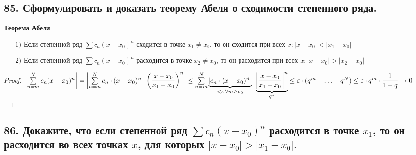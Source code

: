 \documentclass[a4paper, fleqn]{article}
\begin{document}
    \subsection*{85. Сформулировать и доказать теорему Абеля о сходимости степенного ряда.}
	\textbf{ Теорема Абеля} \\[-15 pt] 
	\begin{enumerate}
	\item[$1)$] Если степенной ряд $\sum c_n (x - x_0)^n$ сходится в точке $x_1 \ne x_0$, 
	то он сходится при всех $x : |x - x_0| < |x_1 - x_0|$
	\item[$2)$] Если степенной ряд $\sum c_n (x - x_0)^n$ расходится в точке $x_2 \ne x_0$, 
	то он расходится при всех $x : |x - x_0| > |x_2 - x_0|$\\[-30 pt]
	\end{enumerate}
	\begin{proof}
	$\left| \sum\limits_{n = m}^N c_n (x - x_0)^n \right| = 
	\left| \sum\limits_{n = m}^N c_n \cdot (x - x_0)^n \cdot \left( \dfrac{x - x_0}{x_1 - x_0} \right)^n \right| \le  \\[3 pt]
	\sum\limits_{n = m}^N \underbrace{\left| c_n \cdot (x - x_0)^n \right|}_{< \varepsilon \; \forall m \ge n_0} \cdot 
	\underbrace{\left| \dfrac{x - x_0}{x_1 - x_0} \right|^n}_{q^n}  \le
	\varepsilon \cdot (q^m + \ldots + q^N) \le \varepsilon \cdot q^m \cdot \dfrac1{1 - q} \to 0$
	\end{proof}    

    
    \subsection*{86. Докажите, что если степенной ряд $\displaystyle \sum c_n (x - x_0)^n$ расходится в точке $x_1$, то он расходится во всех точках $x$, для которых $|x - x_0| > |x_1 - x_0|.$}
        
\end{document}
